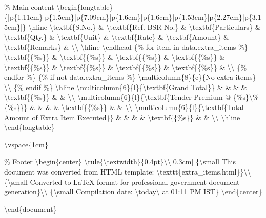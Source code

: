 \% Main content
\textbackslash{}begin\{longtable\}\{|p\{1.11cm\}|p\{1.5cm\}|p\{7.09cm\}|p\{1.6cm\}|p\{1.6cm\}|p\{1.53cm\}|p\{2.27cm\}|p\{3.15cm\}|\}
\textbackslash{}hline
\textbackslash{}textbf\{S.No.\} \& \textbackslash{}textbf\{Ref. BSR No.\} \& \textbackslash{}textbf\{Particulars\} \& \textbackslash{}textbf\{Qty.\} \& \textbackslash{}textbf\{Unit\} \& \textbackslash{}textbf\{Rate\} \& \textbackslash{}textbf\{Amount\} \& \textbackslash{}textbf\{Remarks\} \& \textbackslash{}\textbackslash{}
\textbackslash{}hline
\textbackslash{}endhead
\{\% for item in data.extra\_items \%\}
\textbackslash{}textbf\{\{\%s\}\} \& \textbackslash{}textbf\{\{\%s\}\} \& \textbackslash{}textbf\{\{\%s\}\} \& \textbackslash{}textbf\{\{\%s\}\} \& \textbackslash{}textbf\{\{\%s\}\} \& \textbackslash{}textbf\{\{\%s\}\} \& \textbackslash{}textbf\{\{\%s\}\} \& \textbackslash{}textbf\{\{\%s\}\} \& \textbackslash{}\textbackslash{}
\{\% endfor \%\}
\{\% if not data.extra\_items \%\}
\textbackslash{}multicolumn\{8\}\{c\}\{No extra items\} \textbackslash{}\textbackslash{}
\{\% endif \%\}
\textbackslash{}hline
\textbackslash{}multicolumn\{6\}\{l\}\{\textbackslash{}textbf\{Grand Total\}\} \& \& \& \& \textbackslash{}textbf\{\{\%s\}\} \& \& \textbackslash{}\textbackslash{}
\textbackslash{}multicolumn\{6\}\{l\}\{\textbackslash{}textbf\{Tender Premium @ \{\%s\}\textbackslash{}\% \{\%s\}\}\} \& \& \& \& \textbackslash{}textbf\{\{\%s\}\} \& \& \textbackslash{}\textbackslash{}
\textbackslash{}multicolumn\{6\}\{l\}\{\textbackslash{}textbf\{Total Amount of Extra Item Executed\}\} \& \& \& \& \textbackslash{}textbf\{\{\%s\}\} \& \& \textbackslash{}\textbackslash{}
\textbackslash{}hline
\textbackslash{}end\{longtable\}

\textbackslash{}vspace\{1cm\}

\% Footer
\textbackslash{}begin\{center\}
\textbackslash{}rule\{\textbackslash{}textwidth\}\{0.4pt\}\textbackslash{}\textbackslash{}[0.3cm]
\{\textbackslash{}small This document was converted from HTML template: \textbackslash{}texttt\{extra\_items.html\}\}\textbackslash{}\textbackslash{}
\{\textbackslash{}small Converted to LaTeX format for professional government document generation\}\textbackslash{}\textbackslash{}
\{\textbackslash{}small Compilation date: \textbackslash{}today\textbackslash{} at 01:11 PM IST\}
\textbackslash{}end\{center\}

\textbackslash{}end\{document\}